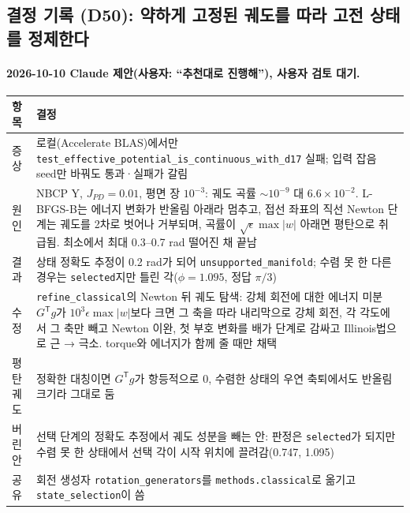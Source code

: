 \subsection{결정 기록 (D50): 약하게 고정된 궤도를 따라 고전 상태를 정제한다}\label{decisions-d50-orbit-refinement}
\begingroup%
  \framesubtitle{2026-10-10 Claude 제안(사용자: ``추천대로 진행해''), 사용자 검토 대기.}
  \small\renewcommand{\arraystretch}{1.12}
  \begin{tabularx}{\textwidth}{@{}P{3.0cm}Y@{}}
    \toprule
    항목 & 결정 \\
    \midrule
    증상 & 로컬(Accelerate BLAS)에서만 \texttt{test\_effective\_potential\_is\_continuous\_with\_d17} 실패; 입력 잡음 seed만 바꿔도 통과·실패가 갈림 \\
    원인 & NBCP Y, $J_{PD}=0.01$, 평면 장 $10^{-3}$: 궤도 곡률 $\sim10^{-9}$ 대 $6.6\times10^{-2}$. L-BFGS-B는 에너지 변화가 반올림 아래라 멈추고, 접선 좌표의 직선 Newton 단계는 궤도를 2차로 벗어나 거부되며, 곡률이 $\sqrt{\epsilon}\max|w|$ 아래면 평탄으로 취급됨. 최소에서 최대 0.3--0.7 rad 떨어진 채 끝남 \\
    결과 & 상태 정확도 추정이 0.2 rad가 되어 \texttt{unsupported\_manifold}; 수렴 못 한 다른 경우는 \texttt{selected}지만 틀린 각($\phi=1.095$, 정답 $\pi/3$) \\
    수정 & \texttt{refine\_classical}의 Newton 뒤 궤도 탐색: 강체 회전에 대한 에너지 미분 $G^{\mathsf T}g$가 $10^3\epsilon\max|w|$보다 크면 그 축을 따라 내리막으로 강체 회전, 각 각도에서 그 축만 빼고 Newton 이완, 첫 부호 변화를 배가 단계로 감싸고 Illinois법으로 근 → 극소. torque와 에너지가 함께 줄 때만 채택 \\
    평탄 궤도 & 정확한 대칭이면 $G^{\mathsf T}g$가 항등적으로 0, 수렴한 상태의 우연 축퇴에서도 반올림 크기라 그대로 둠 \\
    버린 안 & 선택 단계의 정확도 추정에서 궤도 성분을 빼는 안: 판정은 \texttt{selected}가 되지만 수렴 못 한 상태에서 선택 각이 시작 위치에 끌려감(0.747, 1.095) \\
    공유 & 회전 생성자 \texttt{rotation\_generators}를 \texttt{methods.classical}로 옮기고 \texttt{state\_selection}이 씀 \\
    \bottomrule
  \end{tabularx}
\endgroup


